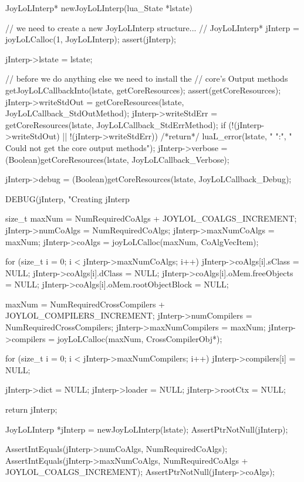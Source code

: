 \startCCode
JoyLoLInterp* newJoyLoLInterp(lua_State *lstate) {
  // we need to create a new JoyLoLInterp structure...
  //
  JoyLoLInterp* jInterp = joyLoLCalloc(1, JoyLoLInterp);
  assert(jInterp);

  jInterp->lstate = lstate;
  
  // before we do anything else we need to install the
  // core's Output methods
  getJoyLoLCallbackInto(lstate, getCoreResources);
  assert(getCoreResources);
  jInterp->writeStdOut =
    getCoreResources(lstate, JoyLoLCallback_StdOutMethod);
  jInterp->writeStdErr =
    getCoreResources(lstate, JoyLoLCallback_StdErrMethod);
  if (!(jInterp->writeStdOut) || !(jInterp->writeStdErr)) {
    /*return*/ luaL_error(lstate, "%
      "\nERROR:\n",
      "  Could not get the core output methods\n");
  }
  jInterp->verbose = 
    (Boolean)getCoreResources(lstate, JoyLoLCallback_Verbose);
    
  jInterp->debug = 
    (Boolean)getCoreResources(lstate, JoyLoLCallback_Debug);

  DEBUG(jInterp, "Creating jInterp %
    
  size_t maxNum =
    NumRequiredCoAlgs + JOYLOL_COALGS_INCREMENT;
  jInterp->numCoAlgs    = NumRequiredCoAlgs;
  jInterp->maxNumCoAlgs = maxNum;
  jInterp->coAlgs    = joyLoLCalloc(maxNum, CoAlgVecItem);
  
  for (size_t i = 0; i < jInterp->maxNumCoAlgs; i++) {
    jInterp->coAlgs[i].sClass               = NULL;
    jInterp->coAlgs[i].dClass               = NULL;
    jInterp->coAlgs[i].oMem.freeObjects     = NULL;
    jInterp->coAlgs[i].oMem.rootObjectBlock = NULL; 
  }

  maxNum =
    NumRequiredCrossCompilers + JOYLOL_COMPILERS_INCREMENT;
  jInterp->numCompilers    = NumRequiredCrossCompilers;
  jInterp->maxNumCompilers = maxNum;
  jInterp->compilers       = joyLoLCalloc(maxNum, CrossCompilerObj*);

  for (size_t i = 0; i < jInterp->maxNumCompilers; i++) {
    jInterp->compilers[i] = NULL;
  }
  
  jInterp->dict    = NULL;
  jInterp->loader  = NULL;
  jInterp->rootCtx = NULL;
    
  return jInterp;
}
\stopCCode


\startCTest
  JoyLoLInterp *jInterp = newJoyLoLInterp(lstate);
  AssertPtrNotNull(jInterp);
  
  AssertIntEquals(jInterp->numCoAlgs,
    NumRequiredCoAlgs);
  AssertIntEquals(jInterp->maxNumCoAlgs,
    NumRequiredCoAlgs + JOYLOL_COALGS_INCREMENT);
  AssertPtrNotNull(jInterp->coAlgs);
  
